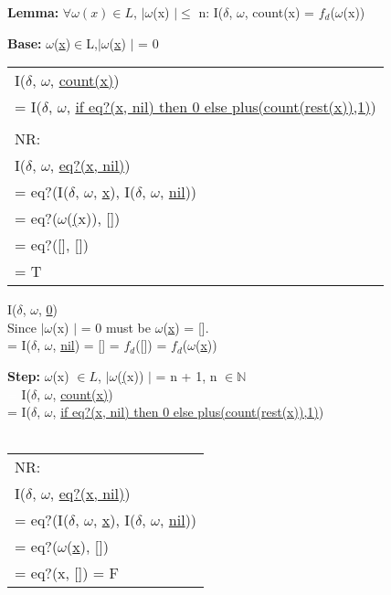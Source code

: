 \documentclass[10pt, a4paper]{article}
\begin{document}
    \begin{description}
        \item \textbf{Lemma:} $\forall\omega(x) \in L$, $\vert \omega$(x) $\vert \leq$ n: I($\delta$,
        $\omega$, count(x) = $f_d$($\omega$(x)) 
        
        \item \textbf{Base:} $\omega$(\underline{x})$ \in $L,$\vert\omega$(\underline{x}) $\vert$ = 0 \\
         \begin{tabular}{ l }
            \hphantom{=} I($\delta$, $\omega$, \underline{count(x)}) \\
            = I($\delta$, $\omega$, \underline{if eq?(x, nil) then 0 else plus(count(rest(x)),1)}) \\ \\

            NR: \\
            \hphantom{=} I($\delta$, $\omega$, \underline{eq?(x, nil)}) \\
              = eq?(I($\delta$, $\omega$, \underline{x}), I($\delta$, $\omega$, \underline{nil})) \\
              = eq?($\omega$(\underline(x)), []) \\
              = eq?([], []) \\
              = T \\ %
            \end{tabular}
       
       I($\delta$, $\omega$, \underline{0}) \\
       Since $\vert\omega$(x) $\vert$ = 0 must be $\omega$(\underline{x}) = []. \\
       = I($\delta$, $\omega$, \underline{nil}) = [] = $f_d$([]) = $f_d$($\omega$(\underline{x}))
       
        \item \textbf{Step:} $\omega$(x) $\in L$, $\vert \omega$(\underline(x)) $\vert$ = n + 1, n $\in     \mathbb{N}$ \\
         \textcolor{white}{=} I($\delta$, $\omega$, \underline{count(x)})  \\
         = I($\delta$, $\omega$, \underline{if eq?(x, nil) then 0 else plus(count(rest(x)),1)}) \\ \\
            \begin{tabular}{ l }
                NR: \\
                \hphantom{=} I($\delta$, $\omega$, \underline{eq?(x, nil)})  \\
                 = eq?(I($\delta$, $\omega$, \underline{x}), I($\delta$, $\omega$, \underline{nil})) \\
                 = eq?($\omega$(\underline{x}), []) \\
                 = eq?(x, []) = F \\
                \end{tabular}
                

\end{description}
\end{document}
